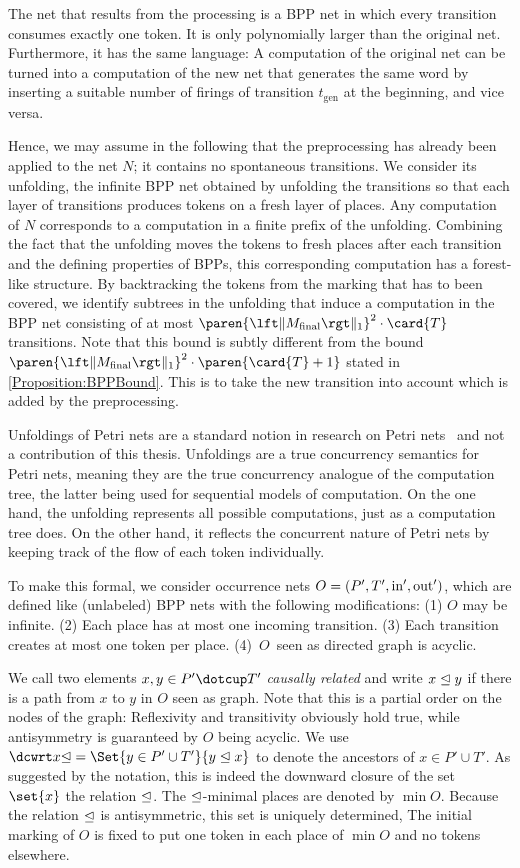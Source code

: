 \documentclass[../../diss.tex]{subfiles}
\begin{document}
The net that results from the processing is a BPP net in which every transition consumes exactly one token.
It is only polynomially larger than the original net.
Furthermore, it has the same language:
A computation of the original net can be turned into a computation of the new net that generates the same word by inserting a suitable number of firings of transition $t_{\text{gen}}$ at the beginning, and vice versa.

Hence, we may assume in the following that the preprocessing has already been applied to the net $N$; it contains no spontaneous transitions.
We consider its unfolding, the infinite BPP net obtained by unfolding the transitions so that each layer of transitions produces tokens on a fresh layer of places.
Any computation of $N$ corresponds to a computation in a finite prefix of the unfolding.
Combining the fact that the unfolding moves the tokens to fresh places after each transition and the defining properties of BPPs, this corresponding computation has a forest-like structure.
By backtracking the tokens from the marking that has to been covered, we identify subtrees in the unfolding that induce a computation in the BPP net consisting of at most $\paren{\normone{\Mfinal}}^2 \cdot \card{T}$ transitions.
Note that this bound is subtly different from the bound $\paren{\normone{\Mfinal}}^2 \cdot \paren{\card{T} +1}$ stated in \cref{Proposition:BPPBound}.
This is to take the new transition into account which is added by the preprocessing.

Unfoldings of Petri nets are a standard notion in research on Petri nets~\cite{EsparzaH08} and not a contribution of this thesis.
Unfoldings are a true concurrency semantics for Petri nets, meaning they are the true concurrency analogue of the computation tree, the latter being used for sequential models of computation.
On the one hand, the unfolding represents all possible computations, just as a computation tree does.
On the other hand, it reflects the concurrent nature of Petri nets by keeping track of the flow of each token individually.

To make this formal, we consider occurrence nets $O = (P', T', \text{in}',\text{out}')$, which are defined like (unlabeled) BPP nets with the following modifications:
(1) $O$ may be infinite.
(2) Each place has at most one incoming transition.
(3) Each transition creates at most one token per place.
\mbox{(4) $O$ seen} as directed graph is acyclic.

We call two elements $x,y \in P'\dotcup T'$ \emph{causally related} and write $x \trianglelefteq y$ if there is a path from $x$ to $y$ in $O$ seen as graph.
Note that this is a partial order on the nodes of the graph: Reflexivity and transitivity obviously hold true, while antisymmetry is guaranteed by $O$ being acyclic.
%
We use $\causalpredec{x}=\Set{y\in P'\cup T'}{y \causal x}$ to denote the ancestors of $x\in P'\cup T'$.
As suggested by the notation, this is indeed the downward closure of the set $\set{x}$ \wrt the relation $\trianglelefteq$.
The $\trianglelefteq$-minimal places are denoted by $\min O$.
Because the relation $\trianglelefteq$ is antisymmetric, this set is uniquely determined,
The initial marking of $O$ is fixed to put one token in each place of $\min O$ and no tokens elsewhere.
\end{document}

